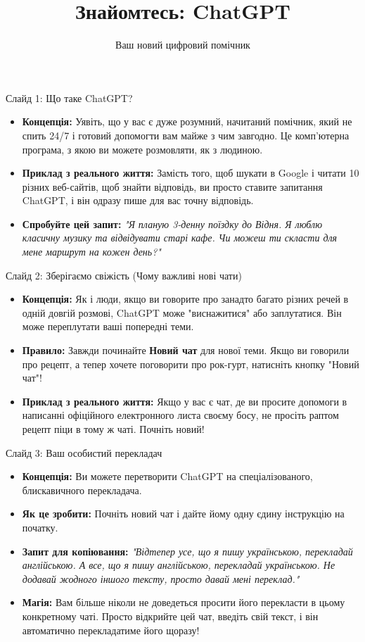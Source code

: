 \documentclass[aspectratio=169]{beamer}
\title{Знайомтесь: ChatGPT}
\subtitle{Ваш новий цифровий помічник}
\author{}
\date{}
\begin{document}
\begin{frame}
    \titlepage
\end{frame}

\begin{frame}{Слайд 1: Що таке ChatGPT?}
    \begin{itemize}
        \item \textbf{Концепція:} Уявіть, що у вас є дуже розумний, начитаний помічник, який не спить 24/7 і готовий допомогти вам майже з чим завгодно. Це комп'ютерна програма, з якою ви можете розмовляти, як з людиною.
        \item \textbf{Приклад з реального життя:} Замість того, щоб шукати в Google і читати 10 різних веб-сайтів, щоб знайти відповідь, ви просто ставите запитання ChatGPT, і він одразу пише для вас точну відповідь.
        \item \textbf{Спробуйте цей запит:} \textit{"Я планую 3-денну поїздку до Відня. Я люблю класичну музику та відвідувати старі кафе. Чи можеш ти скласти для мене маршрут на кожен день?"}
    \end{itemize}
\end{frame}

\begin{frame}{Слайд 2: Зберігаємо свіжість (Чому важливі нові чати)}
    \begin{itemize}
        \item \textbf{Концепція:} Як і люди, якщо ви говорите про занадто багато різних речей в одній довгій розмові, ChatGPT може "виснажитися" або заплутатися. Він може переплутати ваші попередні теми.
        \item \textbf{Правило:} Завжди починайте \textbf{Новий чат} для нової теми. Якщо ви говорили про рецепт, а тепер хочете поговорити про рок-гурт, натисніть кнопку "Новий чат"!
        \item \textbf{Приклад з реального життя:} Якщо у вас є чат, де ви просите допомоги в написанні офіційного електронного листа своєму босу, не просіть раптом рецепт піци в тому ж чаті. Почніть новий!
    \end{itemize}
\end{frame}

\begin{frame}{Слайд 3: Ваш особистий перекладач}
    \begin{itemize}
        \item \textbf{Концепція:} Ви можете перетворити ChatGPT на спеціалізованого, блискавичного перекладача.
        \item \textbf{Як це зробити:} Почніть новий чат і дайте йому одну єдину інструкцію на початку.
        \item \textbf{Запит для копіювання:} \textit{"Відтепер усе, що я пишу українською, перекладай англійською. А все, що я пишу англійською, перекладай українською. Не додавай жодного іншого тексту, просто давай мені переклад."}
        \item \textbf{Магія:} Вам більше ніколи не доведеться просити його перекласти в цьому конкретному чаті. Просто відкрийте цей чат, введіть свій текст, і він автоматично перекладатиме його щоразу!
    \end{itemize}
\end{frame}
\end{document}
